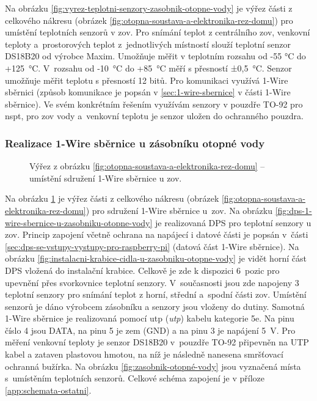 Na obrázku \ref{fig:vyrez-teplotni-senzory-zasobnik-otopne-vody} je výřez části z celkového nákresu (obrázek \ref{fig:otopna-soustava-a-elektronika-rez-domu}) pro umístění teplotních senzorů v \acrshort{zov}. Pro snímání teplot z centrálního \acrshort{zov}, venkovní teploty a~prostorových teplot z~jednotlivých místností slouží teplotní senzor DS18B20 \cite{vyrobce-ds18b20} od výrobce Maxim. Umožňuje měřit v teplotním rozsahu od -55 °C do +125~°C. V~rozsahu od -10~°C do +85~°C měří s přesností ±0,5~°C. Senzor umožňuje měřit teplotu s přesností 12 bitů. Pro komunikaci využívá 1-Wire sběrnici (způsob komunikace je popsán v \ref{sec:1-wire-sbernice} v části 1-Wire sběrnice). Ve svém konkrétním řešením využívám senzory v pouzdře TO-92 pro \acrshort{nspt}, pro \acrshort{zov} vody a~venkovní teplotu je senzor uložen do ochranného pouzdra.

\subsubsection{Realizace 1-Wire sběrnice u zásobníku otopné vody}
\begin{figure}[H]
   \centering
   \def\svgwidth{0.2\columnwidth}
   
   \caption[Výřez pro umístění sdružení 1-Wire sběrnice u \acrshort{zov}.]{Výřez z obrázku \ref{fig:otopna-soustava-a-elektronika-rez-domu} – umístění sdružení 1-Wire sběrnice u \acrshort{zov}.}
    \label{fig:vyrez-1-wire-sbernice-u-zasobniku-otopne-vody}
\end{figure}

Na obrázku \ref{fig:vyrez-1-wire-sbernice-u-zasobniku-otopne-vody} je výřez části z celkového nákresu (obrázek \ref{fig:otopna-soustava-a-elektronika-rez-domu}) pro sdružení 1-Wire sběrnice u~\acrshort{zov}. Na obrázku \ref{fig:dps-1-wire-sbernice-u-zasobniku-otopne-vody} je realizovaná DPS pro teplotní senzory u \acrshort{zov}. Princip zapojení včetně ochrana na napájecí i datové části je popsán v~části \ref{sec:dps-se-vstupy-vystupy-pro-raspberry-pi} (datová část 1-Wire sběrnice). Na obrázku \ref{fig:instalacni-krabice-cidla-u-zasobniku-otopne-vody} je vidět horní část DPS vložená do instalační krabice. Celkově je zde k dispozici 6~pozic pro upevnění přes svorkovnice teplotní senzory. V~současnosti jsou zde napojeny 3 teplotní senzory pro snímání teplot z horní, střední a~spodní části \acrshort{zov}. Umístění senzorů je dáno výrobcem zásobníku a senzory jsou vloženy do dutiny. Samotná 1-Wire sběrnice je realizovaná pomocí \acrshort{utp} (\textit{\acrlong{utp}}) kabelu kategorie 5e. Na pinu číslo 4 jsou DATA, na pinu 5 je zem (GND) a na pinu 3 je napájení 5~V. Pro měření venkovní teploty je senzor DS18B20 v~pouzdře TO-92 připevněn na UTP kabel a zataven plastovou hmotou, na níž je následně nanesena smršťovací ochranná bužírka. Na obrázku \ref{fig:zasobnik-otopné-vody} jsou vyznačená místa s~umístěním teplotních senzorů. Celkové schéma zapojení je v příloze \ref{app:schemata-ostatni}.

